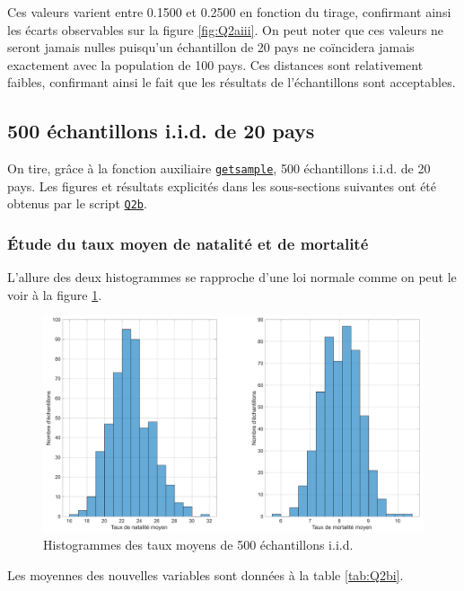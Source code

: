 \documentclass[a4paper, 12pt]{article}
\begin{document}
	Ces valeurs varient entre \num{0.1500} et \num{0.2500} en fonction du tirage, confirmant ainsi les écarts observables sur la figure \ref{fig:Q2aiii}. On peut noter que ces valeurs ne seront jamais nulles puisqu'un échantillon de \num{20} pays ne coïncidera jamais exactement avec la population de \num{100} pays. Ces distances sont relativement faibles, confirmant ainsi le fait que les résultats de l'échantillons sont acceptables.
	
	\subsection{500 échantillons i.i.d. de 20 pays}
	On tire, grâce à la fonction auxiliaire \hyperref[subsec:code-auxiliary]{\texttt{getsample}}, 500 échantillons i.i.d. de 20 pays. Les figures et résultats explicités dans les sous-sections suivantes ont été obtenus par le script \hyperref[subsec:code-Q2]{\texttt{Q2b}}.
	
	\subsubsection{Étude du taux moyen de natalité et de mortalité}
	\label{subsec:Q2bi}
	L'allure des deux histogrammes se rapproche d'une loi normale comme on peut le voir à la figure \ref{fig:Q2bi}.\par
	
	\begin{figure}[!ht]
	    \centering
	    \includegraphics[width=\textwidth]{resources/pdf/figures/Q2bi.pdf}
	    \caption{Histogrammes des taux moyens de 500 échantillons i.i.d.}
	    \label{fig:Q2bi}
	\end{figure}
	
	Les moyennes des nouvelles variables sont données à la table \ref{tab:Q2bi}.\par
	
\end{document}
